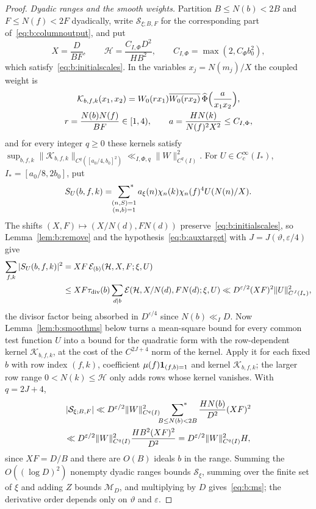 \begin{proof}
\emph{Dyadic ranges and the smooth weights.} Partition $B\le N(b)<2B$ and $F\le N(f)<2F$ dyadically, write $\mathcal S_{\xi;B,F}$ for the corresponding part of~\eqref{eq:b:columnoutput}, and put
\[
  X=\frac D{BF},\qquad\mathcal H=\frac{C_{I,\Phi}D^2}{HB^2},\qquad C_{I,\Phi}=\max(2,C_\Phi b_0^2),
\]
which satisfy~\eqref{eq:b:initialscales}. In the variables $x_j=N(m_j)/X$ the coupled weight is
\[
  \begin{gathered}
  \mathcal K_{b,f,k}(x_1,x_2)=W_0(rx_1)\overline{W_0(rx_2)}\,\widehat\Phi\Bigl(\frac a{x_1x_2}\Bigr),\\
  r=\frac{N(b)N(f)}{BF}\in[1,4),\qquad a=\frac{HN(k)}{N(f)^2X^2}\le C_{I,\Phi},
  \end{gathered}
\]
and for every integer $q\ge0$ these kernels satisfy $\sup_{b,f,k}\|\mathcal K_{b,f,k}\|_{C^q([a_0/4,b_0]^2)}\ll_{I,\Phi,q}\|W\|^2_{C^q(I)}$. For $U\in C_c^\infty(I_*)$, $I_*=[a_0/8,2b_0]$, put
\[
  S_U(b,f,k)=\sideset{}{^*}\sum_{\substack{(n,S)=1\\(n,b)=1}}a_\xi(n)\chi_n(k)\chi_n(f)^4U(N(n)/X).
\]
The shifts $(X,F)\mapsto(X/N(d),FN(d))$ preserve~\eqref{eq:b:initialscales}, so Lemma~\ref{lem:b:remove} and the hypothesis~\eqref{eq:b:auxtarget} with $J=J(\vartheta,\varepsilon/4)$ give
\[
\begin{aligned}
  \sum_{f,k}|S_U(b,f,k)|^2&=XF\,\mathcal{E}_{(b)}(\mathcal H,X,F;\xi,U)\\
  &\le XF\tau_{\rm div}(b)\sum_{d\mid b}\mathcal{E}(\mathcal H,X/N(d),FN(d);\xi,U)\ll D^{\varepsilon/2}(XF)^2\|U\|^2_{C^J(I_*)},
\end{aligned}
\]
the divisor factor being absorbed in $D^{\varepsilon/4}$ since $N(b)\ll_ID$. Now Lemma~\ref{lem:b:smoothms} below turns a mean-square bound for every common test function $U$ into a bound for the quadratic form with the row-dependent kernel $\mathcal K_{b,f,k}$, at the cost of the $C^{2J+4}$ norm of the kernel. Apply it for each fixed $b$ with row index $(f,k)$, coefficient $\mu(f)\mathbf{1}_{(f,b)=1}$ and kernel $\mathcal K_{b,f,k}$; the larger row range $0<N(k)\le\mathcal H$ only adds rows whose kernel vanishes. With $q=2J+4$,
\begin{multline}\label{eq:b:weighted}
  |\mathcal S_{\xi;B,F}|\ll D^{\varepsilon/2}\|W\|^2_{C^q(I)}\sideset{}{^*}\sum_{B\le N(b)<2B}\frac{HN(b)}{D^2}(XF)^2\\
  \ll D^{\varepsilon/2}\|W\|^2_{C^q(I)}\frac{HB^2(XF)^2}{D^2}=D^{\varepsilon/2}\|W\|^2_{C^q(I)}H,
\end{multline}
since $XF=D/B$ and there are $O(B)$ ideals $b$ in the range. Summing the $O((\log D)^2)$ nonempty dyadic ranges bounds $\mathcal S_\xi$, summing over the finite set of $\xi$ and adding $Z$ bounds $\mathcal M_D$, and multiplying by $D$ gives~\eqref{eq:b:ms}; the derivative order depends only on $\vartheta$ and $\varepsilon$.
\end{proof}

